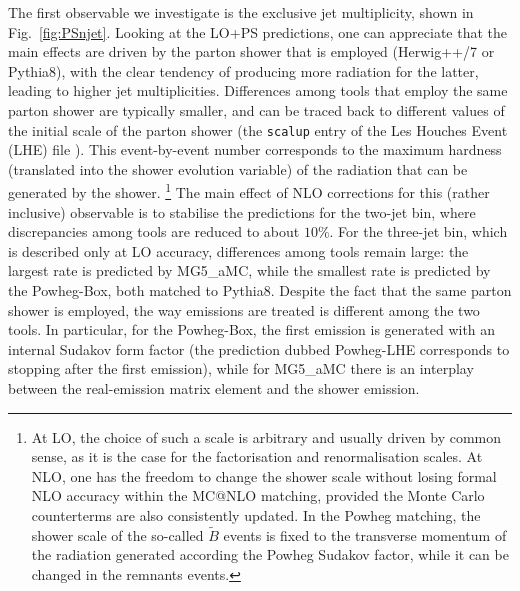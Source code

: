 \documentclass[twocolumn,epjc3]{svjour3} %
\begin{document}
The first observable we investigate is the exclusive jet multiplicity, shown in Fig.~\ref{fig:PSnjet}. Looking at the LO+PS predictions, one can appreciate that the
main effects are driven by the parton shower that is employed ({\sc Herwig++/7} or {\sc Pythia8}), with the clear tendency of producing more radiation for the latter,
leading to higher jet multiplicities. Differences among tools that employ the same parton shower are typically smaller, and can be traced back to different values of the
initial scale of the parton shower (the {\tt scalup} entry of the Les Houches Event (LHE) file \cite{Alwall:2006yp,Butterworth:2010ym}). This event-by-event number corresponds
to the maximum hardness (translated into the shower evolution variable) of the radiation that
can be generated by the shower. \footnote{At LO, the choice of such a scale is arbitrary and usually driven by common sense,
as it is the case for the factorisation and renormalisation scales.
    At NLO, one has the freedom to change the shower scale without losing formal NLO accuracy within the {\sc MC@NLO} matching,
    provided the Monte Carlo counterterms are also consistently
updated. In the {\sc Powheg} matching, the shower scale of the so-called $\tilde B$ events is fixed to the transverse momentum of the radiation
generated according the {\sc Powheg} Sudakov factor, while it can be changed in the remnants events.}
The main effect of NLO corrections for this (rather inclusive) observable is to stabilise the predictions for the two-jet bin, where discrepancies
among tools are reduced to about $10\%$. For the three-jet bin, which is described only at LO accuracy, differences among tools remain large: the largest rate is predicted by
{\sc MG5\_aMC}, while the smallest rate is predicted by the {\sc Powheg-Box}, both matched to {\sc Pythia8}. Despite the fact that the same parton shower is employed, the way emissions are treated
is different among the two tools. In particular, for the {\sc Powheg-Box}, the first emission is generated with an internal Sudakov form factor (the
prediction dubbed {\sc Powheg-LHE} corresponds to stopping after the first emission), while for {\sc MG5\_aMC} there is an
interplay between the real-emission matrix element and the shower emission.
\end{document}
